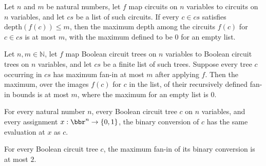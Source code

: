 \begin{theorem}
\label{BoolCircuit.maxDepth_map_le}
\leanok
{}
Let $n$ and $m$ be natural numbers, let $f$ map circuits on $n$ variables to circuits on
$n$ variables, and let $cs$ be a list of such circuits. If every $c\in cs$ satisfies
$\mathrm{depth}(f(c))\le m$, then the maximum depth among the circuits $f(c)$ for $c\in
cs$ is at most $m$, with the maximum defined to be $0$ for an empty list.
\end{theorem}

\begin{theorem}
\label{BoolCircuit.maxFaninL_map_le}
\leanok
{}
Let $n,m\in\mathbb{N}$, let $f$ map Boolean circuit trees on $n$ variables to Boolean
circuit trees on $n$ variables, and let $cs$ be a finite list of such trees. Suppose
every tree $c$ occurring in $cs$ has maximum fan-in at most $m$ after applying $f$. Then
the maximum, over the images $f(c)$ for $c$ in the list, of their recursively defined
fan-in bounds is at most $m$, where the maximum for an empty list is $0$.
\end{theorem}

\begin{theorem}
\label{BoolCircuit.toBinary_eval}
\leanok
{}
For every natural number $n$, every Boolean circuit tree $c$ on $n$ variables, and every
assignment $x : \bbr^n \to \{0,1\}$, the binary conversion of $c$ has the same evaluation
at $x$ as $c$.
\end{theorem}

\begin{theorem}
\label{BoolCircuit.toBinary_maxFanin_le}
\leanok
{}
For every Boolean circuit tree $c$, the maximum fan-in of its binary conversion is at
most $2$.
\end{theorem}

